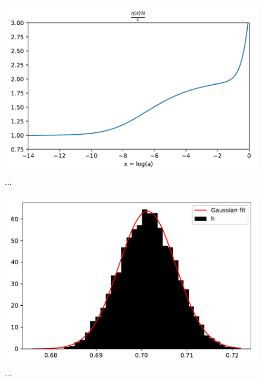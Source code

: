 \documentclass{aa}
\begin{document}
\begin{figure}[h!]
   \includegraphics[scale=0.5]{Figures/M1_etaHc.pdf}
   \caption{...}\label{fig:M1_etaHc}
\end{figure}

\begin{figure}[h!]
   \includegraphics[scale=0.5]{Figures/M1_gaussian.pdf}
   \caption{...}\label{fig:M1_gauss}
\end{figure}
\end{document}

